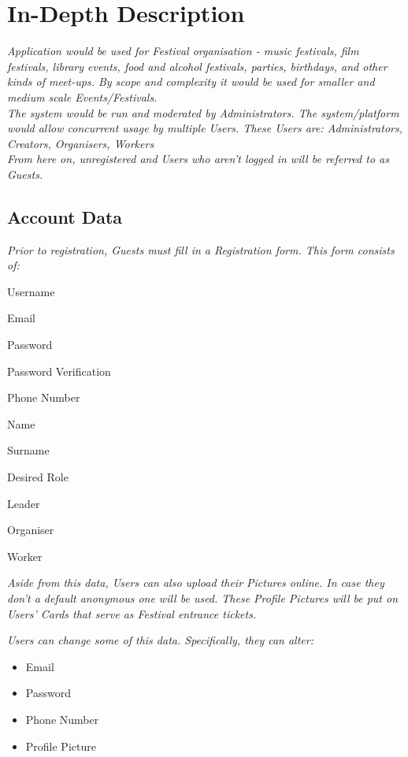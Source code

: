 \section{In-Depth Description}
\textit{Application would be used for Festival organisation - music festivals, film festivals, library events, food and alcohol festivals, parties, birthdays, and other kinds of meet-ups. By scope and complexity it would be used for smaller and medium scale Events/Festivals.}\\

\textit{The system would be run and moderated by Administrators. The system/platform would allow concurrent usage by multiple Users. These Users are: Administrators, Creators, Organisers, Workers}\\

\textit{From here on, unregistered and Users who aren't logged in will be referred to as Guests.}

	\subsection{Account Data}
	\textit{Prior to registration, Guests must fill in a Registration form. This form consists of: }
	\begin{packed_item}
		\item Username
		\item Email
		\item Password
		\item Password Verification
		\item Phone Number
		\item Name
		\item Surname
		\item Desired Role
		\begin{packed_enum}
			\item Leader
			\item Organiser
			\item Worker
		\end{packed_enum}
	\end{packed_item}

	\textit{Aside from this data, Users can also upload their Pictures online. In case they don't a default anonymous one will be used. These Profile Pictures will be put on Users' Cards that serve as Festival entrance tickets.}
	
	\textit{Users can change some of this data. Specifically, they can alter:}
	\begin{itemize}
		\item Email
		\item Password
		\item Phone Number
		\item Profile Picture
	\end{itemize}
	
